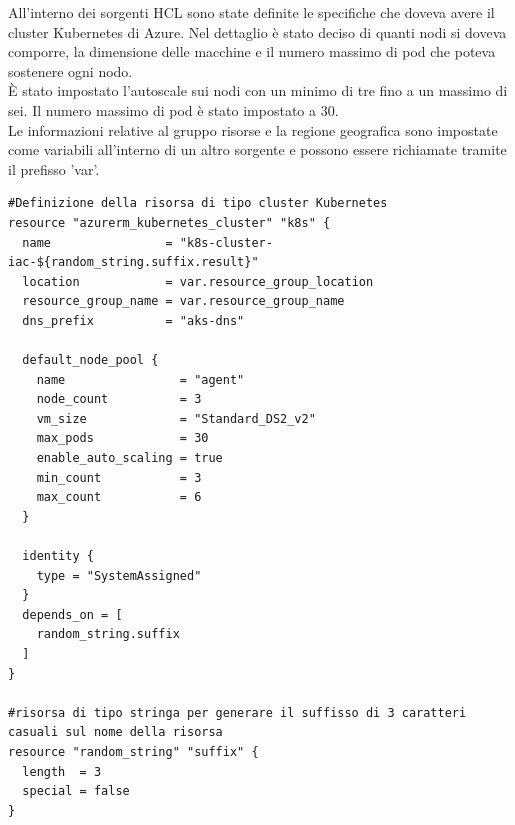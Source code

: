 \documentclass[a4paper,12pt]{report}
\begin{document}
All'interno dei sorgenti HCL sono state definite le specifiche che doveva avere il cluster Kubernetes di Azure. Nel dettaglio è stato deciso di quanti nodi si doveva comporre, la dimensione delle macchine e il numero massimo di pod che poteva sostenere ogni nodo.\\
È stato impostato l'autoscale sui nodi con un minimo di tre fino a un massimo di sei. Il numero massimo di pod è stato impostato a 30.\\
Le informazioni relative al gruppo risorse e la regione geografica sono impostate come variabili all'interno di un altro sorgente e possono essere richiamate tramite il prefisso 'var'.
\begin{lstlisting}[caption={\\\textit{Codice sorgente all'interno del file main.tf.\\ }}]
#Definizione della risorsa di tipo cluster Kubernetes
resource "azurerm_kubernetes_cluster" "k8s" {
  name                = "k8s-cluster-iac-${random_string.suffix.result}"
  location            = var.resource_group_location
  resource_group_name = var.resource_group_name
  dns_prefix          = "aks-dns"

  default_node_pool {
    name                = "agent"
    node_count          = 3
    vm_size             = "Standard_DS2_v2"
    max_pods            = 30
    enable_auto_scaling = true
    min_count           = 3
    max_count           = 6
  }

  identity {
    type = "SystemAssigned"
  }
  depends_on = [
    random_string.suffix
  ]
}

#risorsa di tipo stringa per generare il suffisso di 3 caratteri casuali sul nome della risorsa
resource "random_string" "suffix" {
  length  = 3
  special = false
}
\end{lstlisting}
\end{document}
